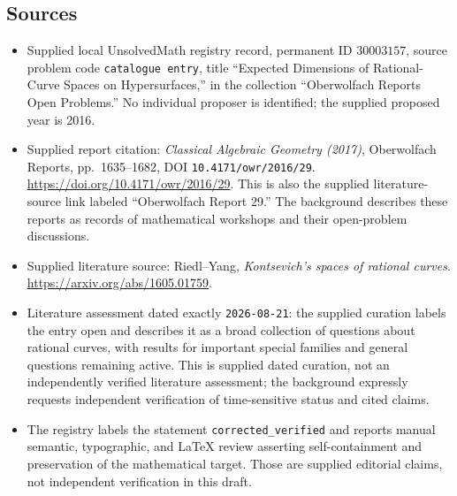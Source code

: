 \documentclass[11pt]{article}
\begin{document}
\subsection{Sources}
\begin{itemize}
\item Supplied local UnsolvedMath registry record, permanent ID \(30003157\), source problem code \texttt{catalogue entry}, title ``Expected Dimensions of Rational-Curve Spaces on Hypersurfaces,'' in the collection ``Oberwolfach Reports Open Problems.'' No individual proposer is identified; the supplied proposed year is 2016.
\item Supplied report citation: \emph{Classical Algebraic Geometry (2017)}, Oberwolfach Reports, pp.~1635--1682, DOI \texttt{10.4171/owr/2016/29}. \url{https://doi.org/10.4171/owr/2016/29}. This is also the supplied literature-source link labeled ``Oberwolfach Report 29.'' The background describes these reports as records of mathematical workshops and their open-problem discussions.
\item Supplied literature source: Riedl--Yang, \emph{Kontsevich's spaces of rational curves}. \url{https://arxiv.org/abs/1605.01759}.
\item Literature assessment dated exactly \texttt{2026-08-21}: the supplied curation labels the entry open and describes it as a broad collection of questions about rational curves, with results for important special families and general questions remaining active. This is supplied dated curation, not an independently verified literature assessment; the background expressly requests independent verification of time-sensitive status and cited claims.
\item The registry labels the statement \texttt{corrected\_verified} and reports manual semantic, typographic, and LaTeX review asserting self-containment and preservation of the mathematical target. Those are supplied editorial claims, not independent verification in this draft.
\end{itemize}
\end{document}
